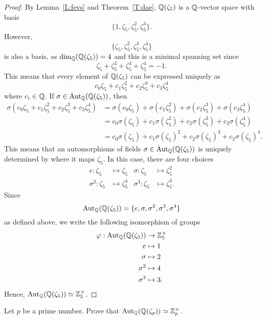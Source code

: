 \documentclass{ximera}
\begin{document}
\begin{example}[$\boldsymbol{\aut_{\pmb\Q}\pmb(\pmb\Q\pmb(\zeta_5\pmb)\pmb)}$]
\begin{proof}
    By Lemma~\ref{L:fevs} and Theorem~\ref{T:dae},
    $\mathbb Q(\zeta_5)$ is a $\mathbb Q$-vector space with basis
    \[
    \{1,\zeta_5,\zeta_5^2,\zeta_5^3\}.
    \]
    However,
    \[
    \{\zeta_5,\zeta_5^2,\zeta_5^3,\zeta_5^4\}
    \]
    is also a basis, as $\dim_\mathbb Q(\mathbb Q(\zeta_5))=4$ and this is a minimal
    spanning set since
    \[
    \zeta_5 + \zeta_5^2  + \zeta_5^3 + \zeta_5^4 = -1.
    \]
    This means that every element of $\mathbb Q(\zeta_5)$ can be expressed
    uniquely as
    \[
    c_0\zeta_5 + c_1\zeta_5^2  + c_2\zeta_5^3 + c_3\zeta_5^4 
    \]
    where $c_i\in\mathbb Q$. If $\sigma\in\operatorname{Aut}_\mathbb Q(\mathbb Q(\zeta_5))$, then
    \begin{align*}
      \sigma(c_0\zeta_5 + c_1\zeta_5^2  + c_2\zeta_5^3 + c_3\zeta_5^4) &= \sigma(c_0\zeta_5) + \sigma(c_1 \zeta_5^2)+ \sigma(c_2 \zeta_5^3)+ \sigma(c_3 \zeta_5^4)\\
      &= c_0 \sigma(\zeta_5) + c_1 \sigma(\zeta_5^2) + c_2 \sigma(\zeta_5^3) + c_3 \sigma(\zeta_5^4)\\
      &= c_0 \sigma(\zeta_5) + c_1 \sigma(\zeta_5)^2 + c_2 \sigma(\zeta_5)^3 + c_3 \sigma(\zeta_5)^4.
    \end{align*}
    This means that an automorphisms of fields $\sigma \in
    \operatorname{Aut}_\mathbb Q(\mathbb Q(\zeta_5))$ is uniquely determined by where it maps
    $\zeta_5$. In this case, there are four choices
    \begin{align*}
      e :\zeta_5 &\mapsto \zeta_5 &  \sigma :\zeta_5 &\mapsto \zeta_5^2\\
      \sigma^2 :\zeta_5 &\mapsto \zeta_5^4 &  \sigma^3 :\zeta_5 &\mapsto \zeta_5^3.
    \end{align*}
    Since
    \[
    \operatorname{Aut}_\mathbb Q(\mathbb Q(\zeta_5)) = \{e,\sigma,\sigma^2,\sigma^3,\sigma^4\}
    \]
    as defined above, we
    write the following isomorphism of groups
    \begin{align*}
      \varphi: \operatorname{Aut}_\mathbb Q(\mathbb Q(\zeta_5)) &\to \mathbb Z_5^\times\\
      e &\mapsto 1\\
      \sigma &\mapsto 2\\
      \sigma^2 &\mapsto 4\\
      \sigma^3 &\mapsto 3.\\
    \end{align*}
    Hence, $\operatorname{Aut}_\mathbb Q(\mathbb Q(\zeta_5))\simeq\mathbb Z_5^\times$.
  \end{proof}
\end{example}

\begin{exercise}
  Let $p$ be a prime number. Prove that $\operatorname{Aut}_\mathbb Q(\mathbb Q(\zeta_p))\simeq
  \mathbb Z_p^\times$.
\end{exercise}
\end{document}
